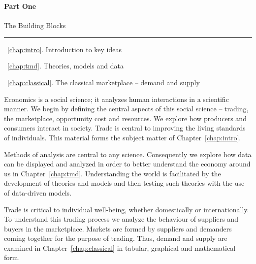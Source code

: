 \cleardoublepage
\thispagestyle{empty}
\vspace{30mm}
{\color{parttextcolour}\fontsize{1.25cm}{3em}\selectfont\textbf{Part One}} \\ \\
{\color{parttextcolour}\huge The Building Blocks}

\vspace{10mm}
{\color{partlinecolour}\rule{25em}{2pt}}
\vspace{10mm}

{\large\color{parttextcolour}
~\ref{chap:intro}. Introduction to key ideas

~\ref{chap:tmd}. Theories, models and data

~\ref{chap:classical}. The classical marketplace -- demand and supply}

\vspace{10mm}

{\normalfont Economics is a social science; it analyzes human interactions in a scientific manner. We begin by defining the central aspects of this social science -- trading, the marketplace, opportunity cost and resources. We explore how producers and consumers interact in society. Trade is central to improving the living standards of individuals. This material forms the subject matter of Chapter~\ref{chap:intro}.

Methods of analysis are central to any science. Consequently we explore how data can be displayed and analyzed in order to better understand the economy around us in Chapter~\ref{chap:tmd}. Understanding the world is facilitated by the development of theories and models and then testing such theories with the use of data-driven models.

Trade is critical to individual well-being, whether domestically or internationally. To understand this trading process we analyze the behaviour of suppliers and buyers in the marketplace. Markets are formed by suppliers and demanders coming together for the purpose of trading. Thus, demand and supply are examined in Chapter~\ref{chap:classical} in tabular, graphical and mathematical form.}

